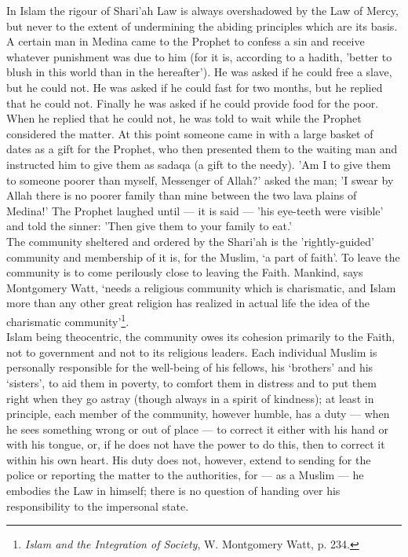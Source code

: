 \documentclass[10pt, twoside,openright]{book}
\begin{document}
In Islam the rigour of Shari'ah Law is always overshadowed by the Law of Mercy, but never to the 
extent of undermining the abiding principles which are its basis. A certain man in Medina came to the 
Prophet to confess a sin and receive whatever punishment was due to him (for it is, according to a 
hadith, 'better to blush in this world than in the hereafter'). He was asked if he could free a 
slave, but he could not. He was asked if he could fast for two months, but he replied that he could 
not. Finally he was asked if he could provide food for the poor. When he replied that he could not, 
he was told to wait while the Prophet considered the matter. At this point someone came in with a 
large basket of dates as a gift for the Prophet, who then presented them to the waiting man and 
instructed him to give them as sadaqa (a gift to the needy). 'Am I to give them to someone poorer 
than myself, Messenger of Allah?' asked the man; 'I swear by Allah there is no poorer family than 
mine between the two lava plains of Medina!' The Prophet laughed until --- it is said --- 'his eye\hyp{}teeth 
were visible' and told the sinner: 'Then give them to your family to eat.' \\

The community sheltered and ordered by the Shari'ah is the 'rightly\hyp{}guided' community and membership 
of it is, for the Muslim, `a part of faith'. To leave the community is to come perilously close to 
leaving the Faith. Mankind, says Montgomery Watt, `needs a religious community which is charismatic, 
and Islam more than any other great religion has realized in actual life the idea of the charismatic 
community'\footnote{\emph{Islam and the Integration of Society}, W. Montgomery Watt, p. 234.}. \\

Islam being theocentric, the community owes its cohesion primarily to the Faith, not to government 
and not to its religious leaders. Each individual Muslim is personally responsible for the well-being 
of his fellows, his `brothers' and his `sisters', to aid them in poverty, to comfort them in distress 
and to put them right when they go astray (though always in a spirit of kindness); at least in 
principle, each member of the community, however humble, has a duty --- when he sees something wrong or 
out of place --- to correct it either with his hand or with his tongue, or, if he does not have the 
power to do this, then to correct it within his own heart. His duty does not, however, extend to 
sending for the police or reporting the matter to the authorities, for --- as a Muslim --- he embodies 
the Law in himself; there is no question of handing over his responsibility to the impersonal state. \\
\end{document}
